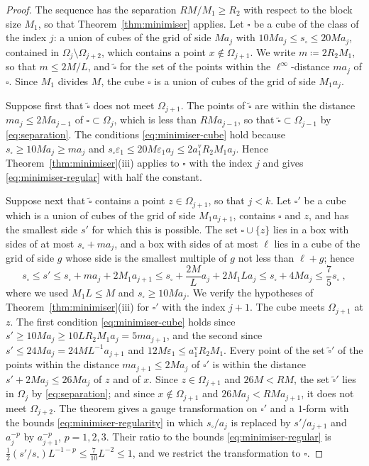 \documentclass[11pt]{preprint}
\numberwithin{equation}{section}
\begin{document}
\begin{proof}
The sequence has the separation $RM/M_1 \geqslant R_2$ with respect to the block size $M_1$, so that Theorem~\ref{thm:minimiser} applies. Let $\square$ be a cube of the class of the index $j$: a union of cubes of the grid of side $Ma_j$ with $10Ma_j \leqslant s_\square \leqslant 20Ma_j$, contained in $\Omega_j \setminus \Omega_{j+2}$, which contains a point $x \notin \Omega_{j+1}$. We write $m \coloneqq 2R_2M_1$, so that $m \leqslant 2M/L$, and $\tilde\square$ for the set of the points within the $\ell^\infty$-distance $ma_j$ of $\square$. Since $M_1$ divides $M$, the cube $\square$ is a union of cubes of the grid of side $M_1a_j$.

Suppose first that $\tilde\square$ does not meet $\Omega_{j+1}$. The points of $\tilde\square$ are within the distance $ma_j \leqslant 2Ma_{j-1}$ of $\square \subset \Omega_j$, which is less than $RMa_{j-1}$, so that $\tilde\square \subset \Omega_{j-1}$ by \eqref{eq:separation}. The conditions \eqref{eq:minimiser-cube} hold because $s_\square \geqslant 10Ma_j \geqslant ma_j$ and $s_\square\varepsilon_1 \leqslant 20M\varepsilon_1a_j \leqslant 2a^{\mathrm v}_1R_2M_1a_j$. Hence Theorem~\ref{thm:minimiser}(iii) applies to $\square$ with the index $j$ and gives \eqref{eq:minimiser-regular} with half the constant.

Suppose next that $\tilde\square$ contains a point $z \in \Omega_{j+1}$, so that $j < k$. Let $\square'$ be a cube which is a union of cubes of the grid of side $M_1a_{j+1}$, contains $\square$ and $z$, and has the smallest side $s'$ for which this is possible. The set $\square \cup \{ z \}$ lies in a box with sides of at most $s_\square + ma_j$, and a box with sides of at most $\ell$ lies in a cube of the grid of side $g$ whose side is the smallest multiple of $g$ not less than $\ell + g$; hence
\[
    s_\square \leqslant s' \leqslant s_\square + ma_j + 2M_1a_{j+1} \leqslant s_\square + \frac{2M}{L}a_j + 2M_1La_j \leqslant s_\square + 4Ma_j \leqslant \frac{7}{5}s_\square\;,
\]
where we used $M_1L \leqslant M$ and $s_\square \geqslant 10Ma_j$. We verify the hypotheses of Theorem~\ref{thm:minimiser}(iii) for $\square'$ with the index $j + 1$. The cube meets $\Omega_{j+1}$ at $z$. The first condition \eqref{eq:minimiser-cube} holds since $s' \geqslant 10Ma_j \geqslant 10LR_2M_1a_j = 5ma_{j+1}$, and the second since $s' \leqslant 24Ma_j = 24ML^{-1}a_{j+1}$ and $12M\varepsilon_1 \leqslant a^{\mathrm v}_1R_2M_1$. Every point of the set $\tilde\square'$ of the points within the distance $ma_{j+1} \leqslant 2Ma_j$ of $\square'$ is within the distance $s' + 2Ma_j \leqslant 26Ma_j$ of $z$ and of $x$. Since $z \in \Omega_{j+1}$ and $26M < RM$, the set $\tilde\square'$ lies in $\Omega_j$ by \eqref{eq:separation}; and since $x \notin \Omega_{j+1}$ and $26Ma_j < RMa_{j+1}$, it does not meet $\Omega_{j+2}$. The theorem gives a gauge transformation on $\square'$ and a $1$-form with the bounds \eqref{eq:minimiser-regularity} in which $s_\square/a_j$ is replaced by $s'/a_{j+1}$ and $a_j^{-p}$ by $a_{j+1}^{-p}$, $p = 1, 2, 3$. Their ratio to the bounds \eqref{eq:minimiser-regular} is $\frac{1}{2}(s'/s_\square)L^{-1-p} \leqslant \frac{7}{10}L^{-2} \leqslant 1$, and we restrict the transformation to $\square$.


\end{proof}
\end{document}

